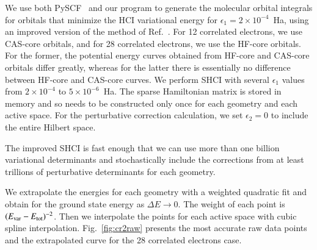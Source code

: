 We use both PySCF~\cite{SunCha_etal_PySCF-ComMolSci-18} and our program to generate the molecular orbital integrals for orbitals that minimize the HCI variational
energy for $\epsilon_1=2\times 10^{-4}$~Ha, using an improved version of the method of Ref.~\cite{SmiMusHolSha-JCTC-17}.
For 12 correlated electrons, we use CAS-core orbitals, and for 28 correlated electrons, we use the HF-core orbitals.
For the former, the potential energy curves obtained from HF-core and CAS-core orbitals differ greatly,
whereas for the latter there is essentially no difference between HF-core and CAS-core curves.
We perform SHCI with several $\epsilon_1$ values from $2\times10^{-4}$ to $5\times10^{-6}$~Ha.
The sparse Hamiltonian matrix is stored in memory and so needs to be constructed only once for each geometry and each active space.
For the perturbative correction calculation, we set $\epsilon_2 = 0$  to include the entire Hilbert space.

The improved SHCI is fast enough that we can use more than one billion variational determinants and stochastically include the corrections from at least trillions of perturbative determinants for each geometry.

We extrapolate the energies for each geometry with a weighted quadratic fit
and obtain for the ground state energy as $\Delta E\to0$.
The weight of each point is $(E_{\rm var} - E_{\rm tot})^{-2}$.
Then we interpolate the points for each active space with cubic spline interpolation.
Fig.~\ref{fig:cr2raw} presents the most accurate raw data points and the extrapolated curve for the 28 correlated electrons case.

